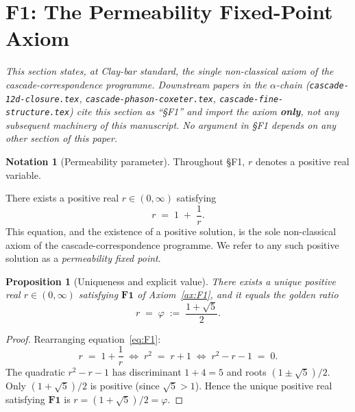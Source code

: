 \documentclass[11pt, a4paper]{amsart}
\newtheorem{proposition}[theorem]{Proposition}
\theoremstyle{definition}
\newtheorem{notation}[theorem]{Notation}
\begin{document}
\tableofcontents

\section{$\mathbf{F1}$: The Permeability Fixed-Point Axiom}
\label{sec:F1}

\noindent\emph{This section states, at Clay-bar standard, the single
non-classical axiom of the cascade-correspondence programme.
Downstream papers in the $\alpha$-chain
(\texttt{cascade-12d-closure.tex},
\texttt{cascade-phason-coxeter.tex},
\texttt{cascade-fine-structure.tex}) cite this section as
``\S F1'' and import the axiom \textbf{only}, not any subsequent
machinery of this manuscript. No argument in \S F1 depends on
any other section of this paper.}

\begin{notation}[Permeability parameter]
\label{not:r}
Throughout \S F1, $r$ denotes a positive real variable.
\end{notation}

\begin{axiom}
\label{ax:F1}
There exists a positive real $r \in (0, \infty)$ satisfying
\begin{equation}
\label{eq:F1}
  r \;=\; 1 \;+\; \frac{1}{r}.
\end{equation}
This equation, and the existence of a positive solution, is
the sole non-classical axiom of the cascade-correspondence
programme. We refer to any such positive solution as a
\emph{permeability fixed point}.
\end{axiom}

\begin{proposition}[Uniqueness and explicit value]
\label{prop:F1-explicit}
There exists a unique positive real $r \in (0, \infty)$
satisfying $\mathbf{F1}$ of Axiom~\ref{ax:F1}, and it equals
the golden ratio
\[
  r \;=\; \varphi \;:=\; \frac{1 + \sqrt{5}}{2}.
\]
\end{proposition}

\begin{proof}
Rearranging equation~\eqref{eq:F1}:
\[
  r \;=\; 1 + \frac{1}{r}
  \;\iff\;
  r^2 \;=\; r + 1
  \;\iff\;
  r^2 - r - 1 \;=\; 0.
\]
The quadratic $r^2 - r - 1$ has discriminant $1 + 4 = 5$
and roots $(1 \pm \sqrt{5})/2$. Only $(1 + \sqrt{5})/2$ is
positive (since $\sqrt{5} > 1$). Hence the unique positive
real satisfying $\mathbf{F1}$ is $r = (1 + \sqrt{5})/2 =
\varphi$.
\end{proof}
\end{document}
